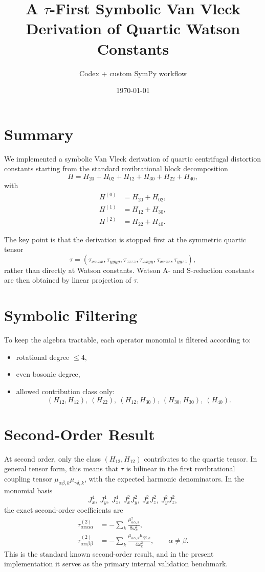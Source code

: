 \documentclass[11pt,a4paper]{article}
\title{A $\tau$-First Symbolic Van Vleck Derivation of Quartic Watson Constants}
\author{Codex + custom SymPy workflow}
\date{\today}
\begin{document}
\maketitle

\section*{Summary}
We implemented a symbolic Van Vleck derivation of quartic centrifugal distortion constants
starting from the standard rovibrational block decomposition
\begin{equation}
H = H_{20} + H_{02} + H_{12} + H_{30} + H_{22} + H_{40},
\end{equation}
with
\begin{align}
H^{(0)} &= H_{20}+H_{02},\\
H^{(1)} &= H_{12}+H_{30},\\
H^{(2)} &= H_{22}+H_{40}.
\end{align}

The key point is that the derivation is stopped first at the symmetric quartic tensor
\begin{equation}
\tau=(\tau_{xxxx},\tau_{yyyy},\tau_{zzzz},\tau_{xxyy},\tau_{xxzz},\tau_{yyzz}),
\end{equation}
rather than directly at Watson constants. Watson A- and S-reduction constants are then obtained
by linear projection of \(\tau\).

\section*{Symbolic Filtering}
To keep the algebra tractable, each operator monomial is filtered according to:
\begin{itemize}
\item rotational degree \(\le 4\),
\item even bosonic degree,
\item allowed contribution class only:
\[
(H_{12},H_{12}),\ (H_{22}),\ (H_{12},H_{30}),\ (H_{30},H_{30}),\ (H_{40}).
\]
\end{itemize}

\section*{Second-Order Result}
At second order, only the class \((H_{12},H_{12})\) contributes to the quartic tensor. In
general tensor form, this means that \(\tau\) is bilinear in the first rovibrational coupling
tensor \(\mu_{\alpha\beta,k}\mu_{\gamma\delta,k}\), with the expected harmonic denominators.
In the monomial basis
\[
J_x^4,\ J_y^4,\ J_z^4,\ J_x^2J_y^2,\ J_x^2J_z^2,\ J_y^2J_z^2,
\]
the exact second-order coefficients are
\begin{align}
\tau_{\alpha\alpha\alpha\alpha}^{(2)} &=
-\sum_k \frac{\mu_{\alpha\alpha,k}^2}{8\omega_k^2},\\
\tau_{\alpha\alpha\beta\beta}^{(2)} &=
-\sum_k \frac{\mu_{\alpha\alpha,k}\mu_{\beta\beta,k}}{4\omega_k^2},
\qquad \alpha \neq \beta.
\end{align}
This is the standard known second-order result, and in the present implementation it serves
as the primary internal validation benchmark.
\end{document}
